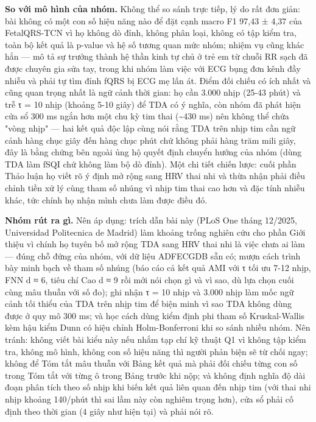 \documentclass[12pt,a4paper]{article}
\begin{document}
\noindent \textbf{\color{tdtblue}So với mô hình của nhóm.} Không thể so sánh trực tiếp, lý do rất đơn giản: bài không có một con số hiệu năng nào để đặt cạnh macro F1 97,43 ± 4,37 của FetalQRS-TCN vì họ không dò đỉnh, không phân loại, không có tập kiểm tra, toàn bộ kết quả là p-value và hệ số tương quan mức nhóm; nhiệm vụ cũng khác hẳn — mô tả sự trưởng thành hệ thần kinh tự chủ ở trẻ em từ chuỗi RR sạch đã được chuyên gia sửa tay, trong khi nhóm làm việc với ECG bụng đơn kênh đầy nhiễu và phải tự tìm đỉnh fQRS bị ECG mẹ lấn át. Điểm đối chiếu có ích nhất và cũng quan trọng nhất là ngữ cảnh thời gian: họ cần 3.000 nhịp (25-43 phút) và trễ τ = 10 nhịp (khoảng 5-10 giây) để TDA có ý nghĩa, còn nhóm đã phát hiện cửa sổ 300 ms ngắn hơn một chu kỳ tim thai (\textasciitilde{}430 ms) nên không thể chứa "vòng nhịp" — hai kết quả độc lập cùng nói rằng TDA trên nhịp tim cần ngữ cảnh hàng chục giây đến hàng chục phút chứ không phải hàng trăm mili giây, đây là bằng chứng bên ngoài ủng hộ quyết định chuyển hướng của nhóm (dùng TDA làm fSQI chứ không làm bộ dò đỉnh). Một chi tiết chiến lược: cuối phần Thảo luận họ viết rõ ý định mở rộng sang HRV thai nhi và thừa nhận phải điều chỉnh tiền xử lý cùng tham số nhúng vì nhịp tim thai cao hơn và đặc tính nhiễu khác, tức chính họ nhận mình chưa làm được điều đó.\par\vspace{3pt}
\noindent \textbf{\color{tdtblue}Nhóm rút ra gì.} Nên áp dụng: trích dẫn bài này (PLoS One tháng 12/2025, Universidad Politecnica de Madrid) làm khoảng trống nghiên cứu cho phần Giới thiệu vì chính họ tuyên bố mở rộng TDA sang HRV thai nhi là việc chưa ai làm — đúng chỗ đứng của nhóm, với dữ liệu ADFECGDB sẵn có; mượn cách trình bày minh bạch về tham số nhúng (báo cáo cả kết quả AMI với τ tối ưu 7-12 nhịp, FNN d ≈ 6, tiêu chí Cao d ≈ 9 rồi mới nói chọn gì và vì sao, dù lựa chọn cuối cùng mâu thuẫn với số đo); ghi nhận τ = 10 nhịp và 3.000 nhịp làm mốc ngữ cảnh tối thiểu của TDA trên nhịp tim để biện minh vì sao TDA không dùng được ở quy mô 300 ms; và học cách dùng kiểm định phi tham số Kruskal-Wallis kèm hậu kiểm Dunn có hiệu chỉnh Holm-Bonferroni khi so sánh nhiều nhóm. Nên tránh: không viết bài kiểu này nếu nhắm tạp chí kỹ thuật Q1 vì không tập kiểm tra, không mô hình, không con số hiệu năng thì người phản biện sẽ từ chối ngay; không để Tóm tắt mâu thuẫn với Bảng kết quả mà phải đối chiếu từng con số trong Tóm tắt với từng ô trong Bảng trước khi nộp; và không định nghĩa độ dài đoạn phân tích theo số nhịp khi biến kết quả liên quan đến nhịp tim (với thai nhi nhịp khoảng 140/phút thì sai lầm này còn nghiêm trọng hơn), cửa sổ phải cố định theo thời gian (4 giây như hiện tại) và phải nói rõ.\par\vspace{3pt}
\vspace{6pt}
\end{document}
